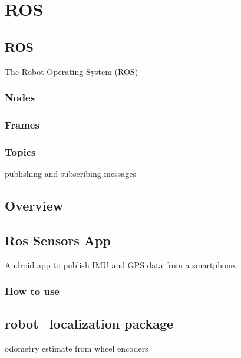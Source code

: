 \chapter{ROS}

\section{ROS}
The Robot Operating System (ROS)


\subsection{Nodes}

\subsection{Frames}

\subsection{Topics}
publishing and subscribing messages


\section{Overview}

\section{Ros Sensors App}
Android app to publish IMU and GPS data from a smartphone.
\subsection{How to use}


\section{robot\_localization package}
odometry estimate from wheel encoders
